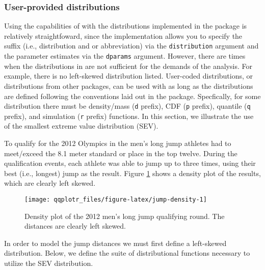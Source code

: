 \FloatBarrier

\subsubsection{User-provided
distributions}\label{user-provided-distributions}

\label{sec:user-dists}

Using the capabilities of  with the distributions
implemented in the  package is relatively straightfoward,
since the implementation allows you to specify the suffix (i.e.,
distribution and or abbreviation) via the \texttt{distribution} argument
and the parameter estimates via the \texttt{dparams} argument. However,
there are times when the distributions in  are not sufficient
for the demands of the analysis. For example, there is no left-skewed
distribution listed. User-coded distributions, or distributions from
other packages, can be used with  as long as the
distributions are defined following the conventions laid out in the
 package. Specfically, for some distribution there must be
density/mass (\texttt{d} prefix), CDF (\texttt{p} prefix), quantile
(\texttt{q} prefix), and simulation (\texttt{r} prefix) functions. In
this section, we illustrate the use of the smallest extreme value
distribution (SEV).

To qualify for the 2012 Olympics in the men's long jump athletes had to
meet/exceed the 8.1 meter standard or place in the top twelve. During
the qualification events, each athlete was able to jump up to three
times, using their best (i.e., longest) jump as the result. Figure
\ref{fig:jump-density} shows a density plot of the results, which are
clearly left skewed.

\begin{Schunk}
\begin{figure}

{\centering \texttt{[image: qqplotr\_files/figure-latex/jump-density-1]} 

}

\caption[Density plot of the 2012 men's long jump qualifying round]{Density plot of the 2012 men's long jump qualifying round. The distances are clearly left skewed.}\label{fig:jump-density}
\end{figure}
\end{Schunk}

In order to model the jump distances we must first define a left-skewed
distribution. Below, we define the suite of distributional functions
necessary to utilize the SEV distribution.

